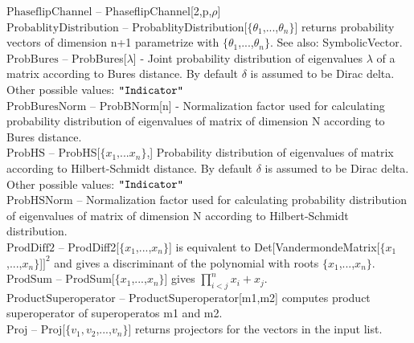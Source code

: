 \documentclass[a4paper,10pt]{scrartcl}
\begin{document}
\textbf{$ \text{PhaseflipChannel} $ }-- PhaseflipChannel[2,p,$\rho $]$  $\\

\textbf{$ \text{ProbablityDistribution} $ }-- ProbablityDistribution[$\{$$ \theta _1 $,...,$ \theta _n $$\}$] returns probability vectors of dimension n+1 parametrize with $\{$$ \theta _1 $,...,$ \theta _n $$\}$. See also: SymbolicVector.$  $\\

\textbf{$ \text{ProbBures} $ }-- ProbBures[$\lambda $] - Joint probability distribution of eigenvalues $\lambda $ of a matrix according to Bures distance. By default $\delta $ is assumed to be Dirac delta. Other possible values: $\texttt{"$ $Indicator$\texttt{"}$} $\\

\textbf{$ \text{ProbBuresNorm} $ }-- ProbBNorm[n] - Normalization factor used for calculating probability distribution of eigenvalues of matrix of dimension N according to Bures distance.$  $\\

\textbf{$ \text{ProbHS} $ }-- ProbHS[$\{$$ x_1\text{,...}x_n $$\}$,] Probability distribution of eigenvalues of matrix according to Hilbert-Schmidt distance. By default $\delta $ is assumed to be Dirac delta. Other possible values: $\texttt{"$ $Indicator$\texttt{"}$} $\\

\textbf{$ \text{ProbHSNorm} $ }-- Normalization factor used for calculating probability distribution of eigenvalues of matrix of dimension N according to Hilbert-Schmidt distribution.$  $\\

\textbf{$ \text{ProdDiff2} $ }-- ProdDiff2[$\{$$ x_1 $,...,$ x_n $$\}$] is equivalent to Det[VandermondeMatrix[$\{$$ x_1 $,...,$ x_n $$\}$]$ ]^2 $ and gives a discriminant of the polynomial with roots $\{$$ x_1 $,...,$ x_n $$\}$.$  $\\

\textbf{$ \text{ProdSum} $ }-- ProdSum[$\{$$ x_1 $,...,$ x_n $$\}$] gives $ \prod _{i<j}^nx_i+x_j. $\\

\textbf{$ \text{ProductSuperoperator} $ }-- ProductSuperoperator[m1,m2] computes product superoperator of superoperatos m1 and m2.$  $\\

\textbf{$ \text{Proj} $ }-- Proj[$\{$$ v_1,v_2 $,...,$ v_n $$\}$] returns projectors for the vectors in the input list.$  $\\
\end{document}
